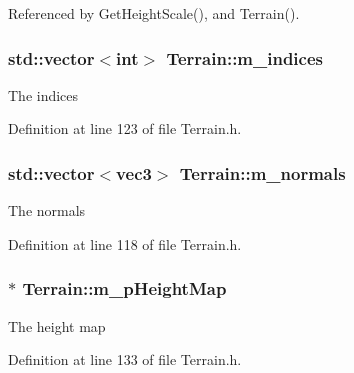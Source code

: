 Referenced by Get\+Height\+Scale(), and Terrain().

\subsubsection[{\texorpdfstring{m\+\_\+indices}{m_indices}}]{\setlength{\rightskip}{0pt plus 5cm}std\+::vector$<$int$>$ Terrain\+::m\+\_\+indices\hspace{0.3cm}{\ttfamily [private]}}\hypertarget{class_terrain_a79132b320d28c77f4c7cb55b9f562631}{}\label{class_terrain_a79132b320d28c77f4c7cb55b9f562631}


The indices 



Definition at line 123 of file Terrain.\+h.

\subsubsection[{\texorpdfstring{m\+\_\+normals}{m_normals}}]{\setlength{\rightskip}{0pt plus 5cm}std\+::vector$<${\bf vec3}$>$ Terrain\+::m\+\_\+normals\hspace{0.3cm}{\ttfamily [private]}}\hypertarget{class_terrain_a36373bed2c1e63fa67f584ec16abc3da}{}\label{class_terrain_a36373bed2c1e63fa67f584ec16abc3da}


The normals 



Definition at line 118 of file Terrain.\+h.

\subsubsection[{\texorpdfstring{m\+\_\+p\+Height\+Map}{m_pHeightMap}}]{$\ast$ Terrain\+::m\+\_\+p\+Height\+Map\hspace{0.3cm}{\ttfamily [private]}}\hypertarget{class_terrain_a1573c3a4a21afe306700bd00e7a9b4f5}{}\label{class_terrain_a1573c3a4a21afe306700bd00e7a9b4f5}


The height map 



Definition at line 133 of file Terrain.\+h.



